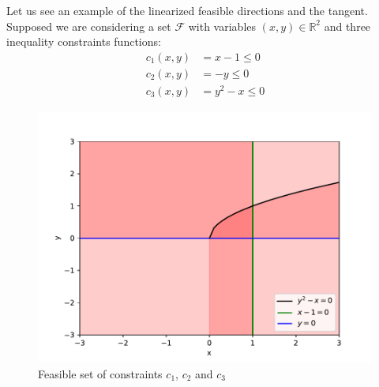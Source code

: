 Let us see an example of the linearized feasible directions and the tangent. Supposed we are considering a set $\mathscr{F}$ with variables $(x,y) \in \mathbb{R}^2$ and three inequality constraints functions: 
$$
\begin{aligned}
    c_1(x,y) &= x-1 \leq 0 \\
    c_2(x,y) &= -y \leq 0\\
    c_3(x,y) &= y^2 - x \leq 0
\end{aligned}
$$
\begin{figure}[t]
    \label{fig:example22_set}
    \centering
    \includegraphics[page=1,width=.7\textwidth]{figs/solution_22.pdf} 
  \caption{Feasible set of constraints $c_1$, $c_2$ and $c_3$}
\end{figure}

